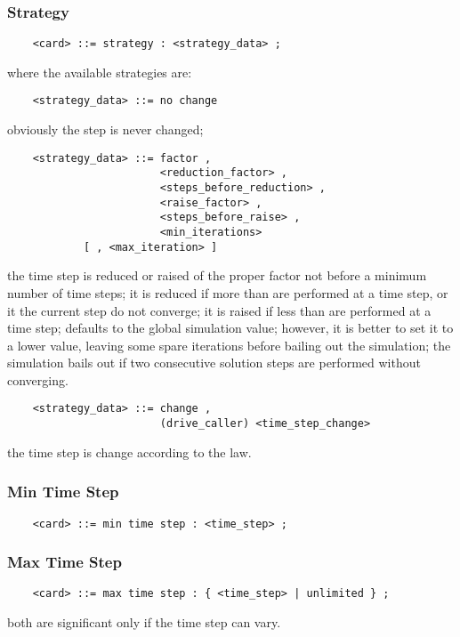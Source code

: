 \subsubsection{Strategy}
\begin{verbatim}
    <card> ::= strategy : <strategy_data> ;
\end{verbatim}
where the available strategies are:
\begin{verbatim}
    <strategy_data> ::= no change 
\end{verbatim}
obviously the step is never changed;
\begin{verbatim}
    <strategy_data> ::= factor , 
                        <reduction_factor> ,
                        <steps_before_reduction> ,
                        <raise_factor> ,
                        <steps_before_raise> ,
                        <min_iterations>
			[ , <max_iteration> ]
\end{verbatim}
the time step is reduced or raised of the proper factor not before a
minimum number of time steps; it is reduced if more than 
 are performed at a time step, or it the current
step do not converge; it is raised if less
than  are performed at a time step;
 defaults to the global 
simulation value; however, it is better to set it to a lower value,
leaving some spare iterations before bailing out the simulation; 
the simulation bails out if two consecutive solution steps
are performed without converging.
\begin{verbatim}
    <strategy_data> ::= change , 
                        (drive_caller) <time_step_change>
\end{verbatim}
the time step is change according to the  law.

\subsubsection{Min Time Step}
\begin{verbatim}
    <card> ::= min time step : <time_step> ;
\end{verbatim}

\subsubsection{Max Time Step}
\begin{verbatim}
    <card> ::= max time step : { <time_step> | unlimited } ;
\end{verbatim}
both are significant only if the time step can vary.

